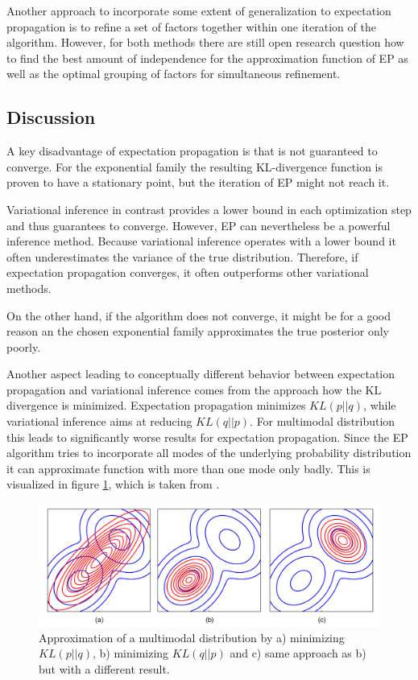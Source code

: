 \documentclass{sigkdd}
\begin{document}
Another approach to incorporate some extent of generalization to expectation propagation is to refine a set of factors together within one iteration of the algorithm. However, for both methods there are still open research question how to find the best amount of independence for the approximation function of EP as well as the optimal grouping of factors for simultaneous refinement.

\subsection{Discussion}
A key disadvantage of expectation propagation is that is not guaranteed to converge. For the exponential family the resulting KL-divergence function is proven to have a stationary point, but the iteration of EP might not reach it.

Variational inference in contrast provides a lower bound in each optimization step and thus guarantees to converge. However, EP can nevertheless be a powerful inference method. Because variational inference operates with a lower bound it often underestimates the variance of the true distribution. Therefore, if expectation propagation converges, it often outperforms other variational methods.

On the other hand, if the algorithm does not converge, it might be for a good reason an the chosen exponential family approximates the true posterior only poorly.

Another aspect leading to conceptually different behavior between expectation propagation and variational inference comes from the approach how the KL divergence is minimized. Expectation propagation minimizes $KL(p||q)$, while variational inference aims at reducing $KL(q||p)$. For multimodal distribution this leads to significantly worse results for expectation propagation. Since the EP algorithm tries to incorporate all modes of the underlying probability distribution it can approximate function with more than one mode only badly. This is visualized in figure \ref{fig:multimodal}, which is taken from \cite{bishop2006prml}.

\begin{figure}[h]
	\begin{center}
		\includegraphics[scale=0.12]{multimodal_approximation.png}
		\caption{Approximation of a multimodal distribution by a) minimizing $KL(p||q)$, b) minimizing $KL(q||p)$ and c) same approach as b) but with a different result.}\label{fig:multimodal}
	\end{center}
\end{figure}
\end{document}
